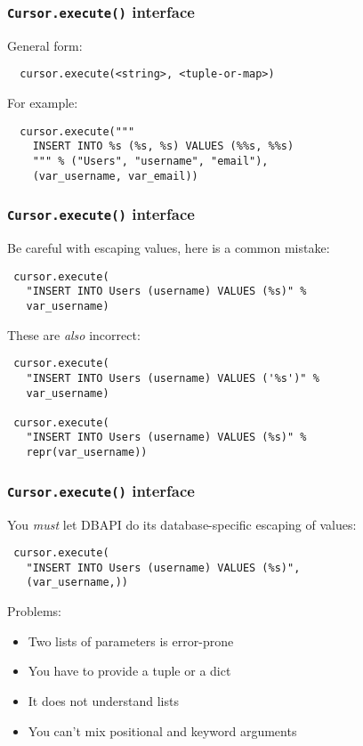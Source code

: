 \documentclass{beamer}
\begin{document}
\begin{frame}[fragile]
  \frametitle{\texttt{Cursor.execute()} interface}

  General form:
\begin{verbatim}
  cursor.execute(<string>, <tuple-or-map>)
\end{verbatim}

\vfill

  For example:
\begin{verbatim}
  cursor.execute("""
    INSERT INTO %s (%s, %s) VALUES (%%s, %%s)
    """ % ("Users", "username", "email"),
    (var_username, var_email))
\end{verbatim}

\end{frame}


\begin{frame}[fragile]
  \frametitle{\texttt{Cursor.execute()} interface}

  Be careful with escaping values, here is a common mistake:
\begin{verbatim}
 cursor.execute(
   "INSERT INTO Users (username) VALUES (%s)" % 
   var_username)
\end{verbatim}

  These are \emph{also} incorrect:
\begin{verbatim}
 cursor.execute(
   "INSERT INTO Users (username) VALUES ('%s')" % 
   var_username)

 cursor.execute(
   "INSERT INTO Users (username) VALUES (%s)" % 
   repr(var_username))
\end{verbatim}

\end{frame}


\begin{frame}[fragile]
  \frametitle{\texttt{Cursor.execute()} interface}

  You \emph{must} let DBAPI do its database-specific escaping of values:
\begin{verbatim}
 cursor.execute(
   "INSERT INTO Users (username) VALUES (%s)",
   (var_username,))
\end{verbatim}

\vfill
Problems:
\begin{itemize}
\item Two lists of parameters is error-prone
\item You have to provide a tuple or a dict
\item It does not understand lists 
\item You can't mix positional and keyword arguments
\end{itemize}

\end{frame}
\end{document}
